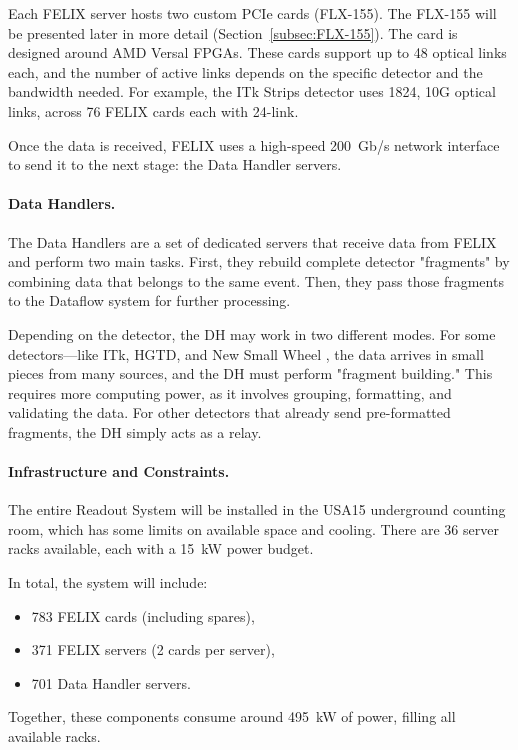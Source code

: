 Each \acs{FELIX} server hosts two custom \acs{PCIe} cards (FLX-155). The FLX-155 will be presented later in more detail (Section~\ref{subsec:FLX-155}). The card is designed around AMD Versal \acs{FPGA}s. These cards support up to 48 optical links each, and the number of active links depends on the specific detector and the bandwidth needed. For example, the \acs{ITk} Strips detector uses 1824, 10G optical links, across 76 FELIX cards each with 24-link.

Once the data is received, \acs{FELIX} uses a high-speed 200~Gb/s network interface to send it to the next stage: the Data Handler servers.

\paragraph{Data Handlers.}
The Data Handlers are a set of dedicated servers that receive data from \acs{FELIX} and perform two main tasks. First, they rebuild complete detector "fragments" by combining data that belongs to the same event. Then, they pass those fragments to the Dataflow system for further processing.

Depending on the detector, the \acs{DH} may work in two different modes. For some detectors—like \acs{ITk}, \acs{HGTD}, and New Small Wheel \cite{nsw}, the data arrives in small pieces from many sources, and the \acs{DH} must perform "fragment building." This requires more computing power, as it involves grouping, formatting, and validating the data. For other detectors that already send pre-formatted fragments, the \acs{DH} simply acts as a relay.

\paragraph{Infrastructure and Constraints.}
The entire Readout System will be installed in the USA15 underground counting room, which has some limits on available space and cooling. There are 36 server racks available, each with a 15~kW power budget.

In total, the system will include:
\begin{itemize}
    \item 783 \acs{FELIX} cards (including spares),
    \item 371 \acs{FELIX} servers (2 cards per server),
    \item 701 Data Handler servers.
\end{itemize}

Together, these components consume around 495~kW of power, filling all available racks.


